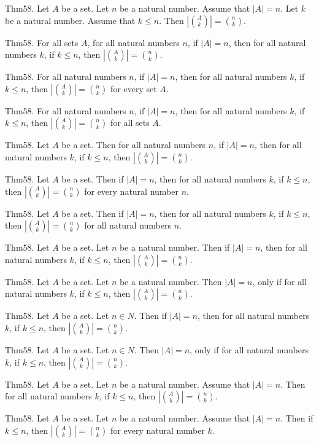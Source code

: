 \documentclass{article}
\begin{document}
Thm58. Let $A$ be a set. Let $n$ be a natural number. Assume that $| A | = n$. Let $k$ be a natural number. Assume that $k \leq n$. Then $| \binom{ A }{ k}| = \binom{ n }{ k}$.

Thm58. For all sets $A$, for all natural numbers $n$, if $| A | = n$, then for all natural numbers $k$, if $k \leq n$, then $| \binom{ A }{ k}| = \binom{ n }{ k}$.

Thm58. For all natural numbers $n$, if $| A | = n$, then for all natural numbers $k$, if $k \leq n$, then $| \binom{ A }{ k}| = \binom{ n }{ k}$ for every set $A$.

Thm58. For all natural numbers $n$, if $| A | = n$, then for all natural numbers $k$, if $k \leq n$, then $| \binom{ A }{ k}| = \binom{ n }{ k}$ for all sets $A$.

Thm58. Let $A$ be a set. Then for all natural numbers $n$, if $| A | = n$, then for all natural numbers $k$, if $k \leq n$, then $| \binom{ A }{ k}| = \binom{ n }{ k}$.

Thm58. Let $A$ be a set. Then if $| A | = n$, then for all natural numbers $k$, if $k \leq n$, then $| \binom{ A }{ k}| = \binom{ n }{ k}$ for every natural number $n$.

Thm58. Let $A$ be a set. Then if $| A | = n$, then for all natural numbers $k$, if $k \leq n$, then $| \binom{ A }{ k}| = \binom{ n }{ k}$ for all natural numbers $n$.

Thm58. Let $A$ be a set. Let $n$ be a natural number. Then if $| A | = n$, then for all natural numbers $k$, if $k \leq n$, then $| \binom{ A }{ k}| = \binom{ n }{ k}$.

Thm58. Let $A$ be a set. Let $n$ be a natural number. Then $| A | = n$, only if for all natural numbers $k$, if $k \leq n$, then $| \binom{ A }{ k}| = \binom{ n }{ k}$.

Thm58. Let $A$ be a set. Let $n \in N$. Then if $| A | = n$, then for all natural numbers $k$, if $k \leq n$, then $| \binom{ A }{ k}| = \binom{ n }{ k}$.

Thm58. Let $A$ be a set. Let $n \in N$. Then $| A | = n$, only if for all natural numbers $k$, if $k \leq n$, then $| \binom{ A }{ k}| = \binom{ n }{ k}$.

Thm58. Let $A$ be a set. Let $n$ be a natural number. Assume that $| A | = n$. Then for all natural numbers $k$, if $k \leq n$, then $| \binom{ A }{ k}| = \binom{ n }{ k}$.

Thm58. Let $A$ be a set. Let $n$ be a natural number. Assume that $| A | = n$. Then if $k \leq n$, then $| \binom{ A }{ k}| = \binom{ n }{ k}$ for every natural number $k$.
\end{document}
